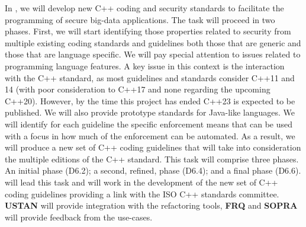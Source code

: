 \begin{Workpackage}{\thewpno}
\begin{Task}
	\TaskResults{%
	}
	\TaskHeader{}
	
	In \theTask, we will develop new C++ coding and security standards to facilitate the programming of secure big-data applications. The task will proceed in two phases. 
First, we will start identifying those properties related to security from multiple existing coding standards and guidelines both those that are generic and those that are language specific. We will pay special attention to issues related to programming language features. A key issue in this context is the interaction with the C++ standard, as most guidelines and standards consider C++11 and 14 (with poor consideration to C++17 and none regarding the upcoming C++20). However, by the time this project has ended C++23 is expected to be published. We will also provide prototype standards for Java-like languages. 
%
We will identify for each guideline the specific enforcement means that can be used with a focus in how much of the enforcement can be automated. As a result, we will produce a new set of C++ coding guidelines that will take into consideration the multiple editions of the C++ standard.
%
This task will comprise three phases. An initial phase (D6.2); a second, refined, phase (D6.4); and a final phase (D6.6).
%
\UCM will lead this task and will work in the development of the new set of C++ coding guidelines providing a link with the ISO C++ standards committee. \textbf{USTAN} will provide integration with the refactoring tools, \textbf{FRQ} and \textbf{SOPRA} will provide feedback from the use-cases. 

\end{Task}


\end{Workpackage}
